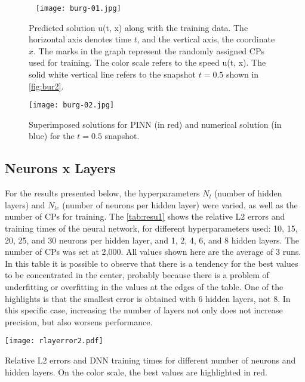 \documentclass[conference]{IEEEtran}
\begin{document}
\begin{figure}[htb]\
\centering
\texttt{[image: burg-01.jpg]}
\caption{Predicted solution u(t, x) along with the training data. The horizontal axis denotes time $t$, and the vertical axis, the coordinate $x$. The marks in the graph represent the randomly assigned CPs used for training. The color scale refers to the speed u(t, x). The solid white vertical line refers to the snapshot $t=0.5$ shown in \autoref{fig:bur2}.} 
\label{fig:bur1}
\end{figure}

\begin{figure}[htb]
\centering
\texttt{[image: burg-02.jpg]}
\caption{Superimposed solutions for PINN (in red) and numerical solution (in blue) for the $t=0.5$ snapshot.}
\label{fig:bur2}
\end{figure}

\subsection{Neurons x Layers}

For the results presented below, the hyperparameters $N_{l}$ (number of hidden layers) and $N_{le}$ (number of neurons per hidden layer) were varied, as well as the number of CPs for training.
The \autoref{tab:resu1} shows the relative L2 errors and training times of the neural network, for different hyperparameters used: 10, 15, 20, 25, and 30 neurons per hidden layer, and 1, 2, 4, 6, and 8 hidden layers.
The number of CPs was set at 2,000.
All values shown here are the average of 3 runs.
In this table it is possible to observe that there is a tendency for the best values to be concentrated in the center, probably because there is a problem of underfitting or overfitting in the values at the edges of the table. One of the highlights is that the smallest error is obtained with 6 hidden layers, not 8. In this specific case, increasing the number of layers not only does not increase precision, but also worsens performance.

\begin{table}[htb]
\centering
\texttt{[image: rlayerror2.pdf]}
\caption{Relative L2 errors and DNN training times for different number of neurons and hidden layers. On the color scale, the best values are highlighted in red.}
\label{tab:resu1}
\end{table}
\end{document}
